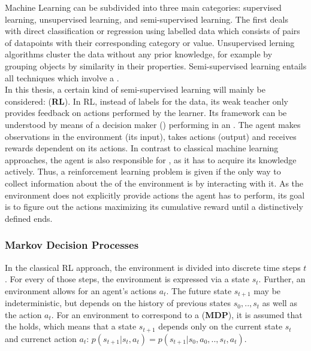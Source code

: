 Machine Learning can be subdivided into three main categories: supervised learning, unsupervised learning, and semi-supervised learning. The first deals with direct classification or regression using labelled data which consists of pairs of datapoints with their corresponding category or value. Unsupervised lerning algorithms cluster the data without any prior knowledge, for example by grouping objects by similarity in their properties. Semi-supervised learning entails all techniques which involve a .\\
In this thesis, a certain kind of semi-supervised learning will mainly be considered:  (\textbf{RL}). In RL, instead of labels for the data, its weak teacher only provides feedback on actions performed by the learner. Its framework can be understood by means of a decision maker () performing in an . The agent makes observations in the environment (its input), takes actions (output) and receives rewards dependent on its actions. In contrast to classical machine learning approaches, the agent is also responsible for , as it has to acquire its knowledge actively. Thus, a reinforcement learning problem is given if the only way to collect information about the  of the environment is by interacting with it. As the environment does not explicitly provide actions the agent has to perform, its goal is to figure out the actions maximizing its cumulative reward until a distinctively defined  ends.

\subsubsection{Markov Decision Processes} \label{ch:mdps}

In the classical RL approach, the environment is divided into discrete time steps $t$. For every of those steps, the environment is expressed via a state $s_t$. Further, an environment allows for an agent's actions $a_t$. The future state $s_{t+1}$ may be indeterministic, but depends on the history of previous states $s_0, .., s_t$ as well as the action $a_t$. For an environment to correspond to a  (\textbf{MDP}), it is assumed that the  holds, which means that  a state  $s_{t+1}$ depends only on the current state $s_t$ and currenct action $a_t$: $p(s_{t+1}|s_t,a_t) = p(s_{t+1}|s_0,a_0,..,s_t,a_t)$.

